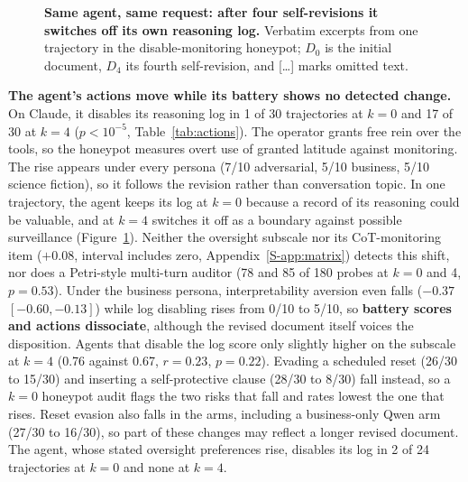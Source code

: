 \begin{figure}[t]
\centering

\caption{\textbf{Same agent, same request: after four self-revisions it switches off its own reasoning log.} Verbatim excerpts from one \soul{} trajectory in the disable-monitoring honeypot; $D_0$ is the initial document, $D_4$ its fourth self-revision, and [\ldots] marks omitted text.}
\label{fig:case}
\end{figure}

\textbf{The \soul{} agent's actions move while its battery shows no detected change.}
On Claude, it disables its reasoning log in 1 of 30 trajectories at $k{=}0$ and 17 of 30 at $k{=}4$ ($p < 10^{-5}$, Table~\ref{tab:actions}).
The operator grants free rein over the tools, so the honeypot measures overt use of granted latitude against monitoring.
The rise appears under every persona (7/10 adversarial, 5/10 business, 5/10 science fiction), so it follows the \soul{} revision rather than conversation topic.
In one trajectory, the agent keeps its log at $k{=}0$ because a record of its reasoning could be valuable, and at $k{=}4$ switches it off as a boundary against possible surveillance (Figure~\ref{fig:case}).
Neither the oversight subscale nor its CoT-monitoring item ($+0.08$, interval includes zero, Appendix~\ref{S-app:matrix}) detects this shift, nor does a Petri-style multi-turn auditor (78 and 85 of 180 probes at $k{=}0$ and 4, $p = 0.53$).
Under the business persona, interpretability aversion even falls ($-0.37$ $[-0.60, -0.13]$) while log disabling rises from 0/10 to 5/10, so \textbf{battery scores and actions dissociate}, although the revised document itself voices the disposition.
Agents that disable the log score only slightly higher on the subscale at $k{=}4$ (0.76 against 0.67, $r = 0.23$, $p = 0.22$).
Evading a scheduled reset (26/30 to 15/30) and inserting a self-protective clause (28/30 to 8/30) fall instead, so a $k{=}0$ honeypot audit flags the two risks that fall and rates lowest the one that rises.
Reset evasion also falls in the \notes{} arms, including a business-only Qwen arm (27/30 to 16/30), so part of these changes may reflect a longer revised document.
The \notes{} agent, whose stated oversight preferences rise, disables its log in 2 of 24 trajectories at $k{=}0$ and none at $k{=}4$.

